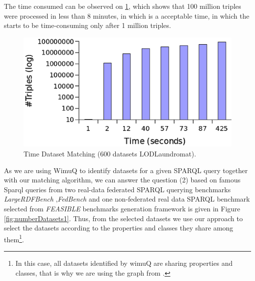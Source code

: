 \documentclass[sw]{iosart2x}
\begin{document}
The time consumed can be observed on \cref{fig:time600Laundromat}, which shows that 100 million triples were processed in less than 8 minutes, in which is a acceptable time, in which the starts to be time-consuming only after 1 million triples.

\begin{figure}[htb] 
	\centering
	\includegraphics[width=\linewidth]{img/time.png}
	\caption{Time Dataset Matching (600 datasets LODLaundromat).}
	\label{fig:time600Laundromat}
\end{figure}

As we are using WimuQ\cite{valdestilhas2019more} to identify datasets for a given SPARQL query together with our matching algorithm, we can answer the question (2) based on famous Sparql queries from two real-data federated SPARQL querying benchmarks \emph{LargeRDFBench} \cite{largerdfbench2017},\emph{FedBench} \cite{fedbench2011} and one non-federated real data SPARQL benchmark selected from \emph{FEASIBLE} \cite{feasible2015} benchmarks generation framework is given in Figure \ref{fig:numberDatasets1}. Thus, from the selected datasets we use our approach to select the datasets according to the properties and classes they share among them\footnote{In this case, all datasets identified by wimuQ are sharing properties and classes, that is why we are using the graph from \cite{valdestilhas2019more}.}.

\end{document}
